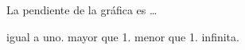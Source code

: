 La pendiente de la gráfica es \dots

\begin{oneparchoices}
    \choice igual a uno.
    \choice mayor que 1.
    \CorrectChoice menor que 1.
    \choice infinita.
\end{oneparchoices}